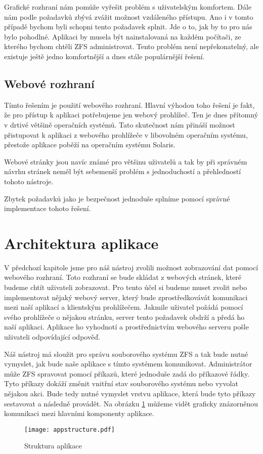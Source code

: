     Grafické rozhraní nám pomůže vyřešit problém s uživatelským komfortem. Dále nám podle požadavků zbývá zvážit možnost vzdáleného přístupu. Ano i v tomto případě bychom byli schopni tento požadavek splnit. Jde o to, jak by to pro nás bylo pohodlné. Aplikaci by musela být nainstalovaná na každém počítači, ze kterého bychom chtěli ZFS administrovat. Tento problém není nepřekonatelný, ale existuje ještě jedno komfortnější a dnes stále populárnější řešení.
    \subsection{Webové rozhraní}
    Tímto řešením je použití webového rozhraní. Hlavní výhodou toho řešení je fakt, že pro přístup k aplikaci potřebujeme jen webový prohlížeč. Ten je dnes přítomný v drtivé většině operačních systémů. Tato skutečnost nám přináší možnost přistupovat k aplikaci z webového prohlížeče v libovolném operačním systému, přestože aplikace poběží na operačním systému Solaris.

    Webové stránky jsou navíc známé pro většinu uživatelů a tak by při správném návrhu stránek neměl být sebemenší problém s jednoduchostí a přehledností tohoto nástroje.

    Zbytek požadavků jako je bezpečnost jednoduše splníme pomocí správné implementace tohoto řešení.
\section{Architektura aplikace}
V předchozí kapitole jsme pro náš nástroj zvolili možnost zobrazování dat pomocí webového rozhraní. Toto rozhraní se bude skládat z webových stránek, které budeme chtít uživateli zobrazovat. Pro tento účel si budeme muset zvolit nebo implementovat nějaký webový server, který bude zprostředkovávát komunikaci mezi naší aplikací a klientským prohlížečem. Jakmile uživatel požádá pomocí svého prohlížeče o nějakou stránku, server tento požadavek obdrží a předá ho naší aplikaci. Aplikace ho vyhodnotí a prostřednictvím webového serveru pošle uživateli odpovídající odpověď.

Náš nástroj má sloužit pro správu souborového systému ZFS a tak bude nutné vymyslet, jak bude naše aplikace s tímto systémem komunikovat. Administrátor může ZFS spravovat pomocí příkazů, které jednoduše zadá do příkazové řádky. Tyto příkazy dokáží změnit vnitřní stav souborového systému nebo vyvolat nějakou akci. Bude tedy nutné vymyslet vrstvu aplikace, která bude tyto příkazy sestavovat a následně provádět. Na obrázku \ref{architecture} můžeme vidět graficky znázorněnou komunikaci mezi hlavními komponenty aplikace.
\begin{figure}[h]
        \caption{Struktura aplikace}
        \label{architecture}
        \centering
        \texttt{[image: appstructure.pdf]}
\end{figure}
